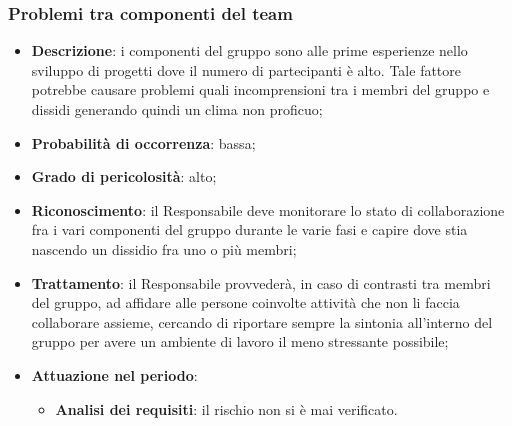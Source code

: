 		\subsubsection{Problemi tra componenti del team}
		\begin{itemize}
			\item \textbf{Descrizione}: i componenti del gruppo sono alle prime esperienze nello sviluppo di progetti dove il numero di partecipanti è alto. Tale fattore potrebbe causare problemi quali incomprensioni tra i membri del gruppo e dissidi generando quindi un clima non proficuo;
			\item \textbf{Probabilità di occorrenza}: bassa;
			\item \textbf{Grado di pericolosità}: alto;
			\item \textbf{Riconoscimento}: il Responsabile deve monitorare lo stato di collaborazione fra i vari componenti del gruppo durante le varie fasi e capire dove stia nascendo un dissidio fra uno o più membri;
			\item \textbf{Trattamento}: il Responsabile provvederà, in caso di contrasti tra membri del gruppo, ad affidare alle persone coinvolte attività che non li faccia collaborare assieme, cercando di riportare sempre la sintonia all'interno del gruppo per avere un ambiente di lavoro il meno stressante possibile;
			\item \textbf{Attuazione nel periodo}:
			\begin{itemize}
				\item \textbf{Analisi dei requisiti}: il rischio non si è mai verificato.
			\end{itemize}
		\end{itemize}
